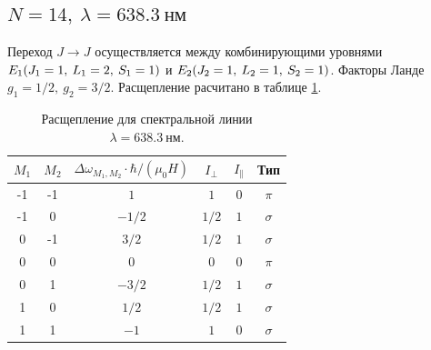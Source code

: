 \documentclass[12pt]{article}
\begin{document}
	\subsection*{$N=14,\:\lambda =638.3\ \text{нм}$}
	Переход $J \rightarrow J$	осуществляется между комбинирующими уровнями $E_1\qty(J_1 = 1,\: L_1 = 2,\: S_1 = 1)$ и $E_2\qty(J_2 = 1,\: L_2 = 1,\: S_2 = 1)$. Факторы Ланде $g_1 = 1/2,\: g_2 = 3/2$. Расщепление расчитано в таблице \ref{table:4}.
	\begin{table}[h!]
		\centering
		\begin{tabular}{|c c c c c c|} 
 			\hline
 			$M_1$ & $M_2$ & $\Delta \omega_{M_1, M_2} \cdot \hbar / (\mu_0 H)$ & $I_{\perp}$ & $I_{\|}$ & Тип \\ [0.5ex] 
 			\hline
 			-1 & -1 & $1$ & $1$ & $0$ & $\pi$ \\
 			-1 & 0 & $-1/2$ & $1/2$ & $1$ & $\sigma$ \\
 			0 & -1 & $3/2$ & $1/2$ & $1$ & $\sigma$ \\
 			0 & 0 & $0$ & $0$ & $0$ & $\pi$ \\
 			0 & 1 & $-3/2$ & $1/2$ & $1$ & $\sigma$ \\
 			1 & 0 & $1/2$ & $1/2$ & $1$ & $\sigma$ \\
 			1 & 1 & $-1$ & $1$ & $0$ & $\sigma$ \\
 			\hline
		\end{tabular}
		\caption{Расщепление для спектральной линии $\lambda = 638.3\ \text{нм}$.}
		\label{table:4}
	\end{table}
\end{document}
